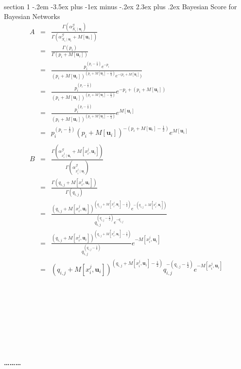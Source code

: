 \documentclass[12pt]{article}
\makeatletter
\newenvironment{problem}{\@startsection
       {section}
       {1}
       {-.2em}
       {-3.5ex plus -1ex minus -.2ex}
       {2.3ex plus .2ex}
       {\pagebreak[3]%
       \large\bf\noindent{Problem }
       }
       }
       {%
       \begin{center}\large\bf \ldots\ldots\ldots\end{center}}
\makeatother
\begin{document}
\begin{problem}{Bayesian Score for Bayesian Networks}
\begin{eqnarray*}
A & = & \frac{\Gamma(\alpha^{\mathcal{G}}_{X_{i}\mid \mathbf{u}_{i}})}{\Gamma(\alpha^{\mathcal{G}}_{X_{i}\mid \mathbf{u}_{i}} + M[ \mathbf{u}_{i}])} \\
& = & \frac{\Gamma(p_{i})}{\Gamma(p_{i} + M[ \mathbf{u}_{i}])} \\
& = & \frac{p_{i}^{(p_{i}-\frac{1}{2})} e^{-p_{i}}}{(p_{i} + M[ \mathbf{u}_{i}])^{(p_{i} + M[ \mathbf{u}_{i}] - \frac{1}{2})}e^{-(p_{i} + M[ \mathbf{u}_{i}]})} \\
& = & \frac{p_{i}^{(p_{i}-\frac{1}{2})} }{(p_{i} + M[ \mathbf{u}_{i}])^{(p_{i} + M[ \mathbf{u}_{i}] - \frac{1}{2})}} e^{-p_{i}+(p_{i} + M[ \mathbf{u}_{i}])} \\
& = & \frac{p_{i}^{(p_{i}-\frac{1}{2})} }{(p_{i} + M[ \mathbf{u}_{i}])^{(p_{i} + M[ \mathbf{u}_{i}] - \frac{1}{2})}} e^{ M[ \mathbf{u}_{i}]} \\
& = & p_{i}^{(p_{i}-\frac{1}{2})} 
	(p_{i} + M[ \mathbf{u}_{i}])^{-(p_{i} + M[ \mathbf{u}_{i}] - \frac{1}{2})} 
	e^{ M[ \mathbf{u}_{i}]} \\
\\
B & = & \frac{\Gamma(\alpha^{\mathcal{G}}_{x_{i}^{j}\mid \mathbf{u}_{i}} + M[ x_{i}^{j},\mathbf{u}_{i}])}{\Gamma(\alpha^{\mathcal{G}}_{x_{i}^{j}\mid \mathbf{u}_{i}} )}\\
& = & \frac{\Gamma(q_{i,j}  + M[ x_{i}^{j},\mathbf{u}_{i}])}{\Gamma(q_{i,j} )}\\
& = & \frac{(q_{i,j}  + M[ x_{i}^{j},\mathbf{u}_{i}])^{(q_{i,j}  + M[ x_{i}^{j},\mathbf{u}_{i}] -\frac{1}{2})}e^{-(q_{i,j}  + M[ x_{i}^{j},\mathbf{u}_{i}])}}{q_{i,j} ^{(q_{i,j} -\frac{1}{2})} e^{-q_{i,j} }}\\
& = & \frac{(q_{i,j}  + M[ x_{i}^{j},\mathbf{u}_{i}])^{(q_{i,j}  + M[ x_{i}^{j},\mathbf{u}_{i}] -\frac{1}{2})}}{q_{i,j} ^{(q_{i,j} -\frac{1}{2})} } 
	e^{-M[ x_{i}^{j},\mathbf{u}_{i}]}\\
& = & (q_{i,j}  + M[ x_{i}^{j},\mathbf{u}_{i}])^{(q_{i,j}  + M[ x_{i}^{j},\mathbf{u}_{i}] -\frac{1}{2})}
	q_{i,j} ^{-(q_{i,j} -\frac{1}{2})} 
	e^{-M[ x_{i}^{j},\mathbf{u}_{i}]}\\
\end{eqnarray*}
\\
\\
\\
\\   
\\
\\   
\\
\begin{eqnarray*}

\end{eqnarray*}
\end{problem}
\end{document}
